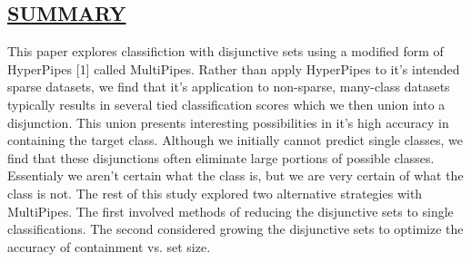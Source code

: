 \begin{kasten}
    \section*{ \hspace{0.1cm} {\color{red} \underline{SUMMARY}}}
    \Large{

\hspace{6mm}This paper explores classifiction with disjunctive sets using a modified form of HyperPipes [1] called MultiPipes. Rather than apply HyperPipes to it's intended sparse datasets, we find that it's application to non-sparse, many-class datasets typically results in several tied classification scores which we then union into a disjunction. This union presents interesting possibilities in it's high accuracy in containing the target class. Although we initially cannot predict single classes, we find that these disjunctions often eliminate large portions of possible classes. Essentialy we aren't certain what the class is, but we are very certain of what the class is not. The rest of this study explored two alternative strategies with MultiPipes. The first involved methods of reducing the disjunctive sets to single classifications. The second considered growing the disjunctive sets to optimize the accuracy of containment vs. set size.
    }
\end{kasten}

